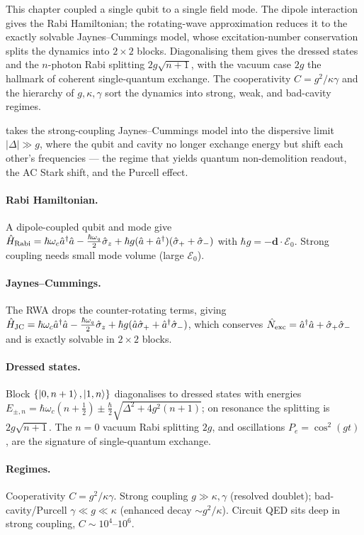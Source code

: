 This chapter coupled a single qubit to a single field mode. The
dipole interaction gives the Rabi Hamiltonian; the rotating-wave
approximation reduces it to the exactly solvable Jaynes--Cummings
model, whose excitation-number conservation splits the dynamics into
$2\times2$ blocks. Diagonalising them gives the dressed states and
the $n$-photon Rabi splitting $2g\sqrt{n+1}$, with the vacuum case
$2g$ the hallmark of coherent single-quantum exchange. The
cooperativity $C=g^2/\kappa\gamma$ and the hierarchy of $g,\kappa,\gamma$
sort the dynamics into strong, weak, and bad-cavity regimes.

 takes the strong-coupling Jaynes--Cummings
model into the dispersive limit $|\Delta|\gg g$, where the qubit and
cavity no longer exchange energy but shift each other's frequencies
--- the regime that yields quantum non-demolition readout, the AC
Stark shift, and the Purcell effect.

\clearpage
\begin{chaptersummary}

\paragraph{Rabi Hamiltonian.}
A dipole-coupled qubit and mode give
$\hat{H}_{\rm Rabi}=\hbar\omega_c\hat a^\dagger\hat a-\tfrac{\hbar\omega_q}2\hat\sigma_z+\hbar g(\hat a+\hat a^\dagger)(\hat\sigma_++\hat\sigma_-)$
with $\hbar g=-\bm d\cdot\bm{\mathcal E}_0$. Strong coupling needs
small mode volume (large $\mathcal E_0$).

\paragraph{Jaynes--Cummings.}
The RWA drops the counter-rotating terms, giving
$\hat{H}_{\rm JC}=\hbar\omega_c\hat a^\dagger\hat a-\tfrac{\hbar\omega_q}2\hat\sigma_z+\hbar g(\hat a\hat\sigma_++\hat a^\dagger\hat\sigma_-)$,
which conserves $\hat{N}_{\rm exc}=\hat a^\dagger\hat a+\hat\sigma_+\hat\sigma_-$
and is exactly solvable in $2\times2$ blocks.

\paragraph{Dressed states.}
Block $\{\ket{0,n+1},\ket{1,n}\}$ diagonalises to dressed states
with energies
$E_{\pm,n}=\hbar\omega_c(n+\tfrac12)\pm\tfrac\hbar2\sqrt{\Delta^2+4g^2(n+1)}$;
on resonance the splitting is $2g\sqrt{n+1}$. The $n=0$ vacuum Rabi
splitting $2g$, and oscillations $P_e=\cos^2(gt)$, are the signature
of single-quantum exchange.

\paragraph{Regimes.}
Cooperativity $C=g^2/\kappa\gamma$. Strong coupling $g\gg\kappa,\gamma$
(resolved doublet); bad-cavity/Purcell $\gamma\ll g\ll\kappa$
(enhanced decay $\sim g^2/\kappa$). Circuit QED sits deep in strong
coupling, $C\sim10^4$--$10^6$.

\end{chaptersummary}

